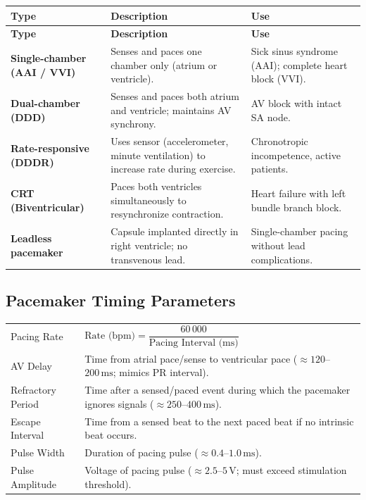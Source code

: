 \documentclass[12pt,a4paper]{article}
\renewcommand{\arraystretch}{1.45}
\begin{document}
\par\noindent
\begingroup
\setlength{\LTleft}{0pt}
\setlength{\LTright}{0pt}
\begin{longtable}{|B{2.8cm}|>{\small\raggedright\arraybackslash}m{\dimexpr(\linewidth-2.8cm-6\arrayrulewidth)/2\relax}|>{\small\raggedright\arraybackslash}m{\dimexpr(\linewidth-2.8cm-6\arrayrulewidth)/2\relax}|}
\hline
\textbf{Type} & \textbf{\color{myteal}Description} & \textbf{\color{mygreen}Use} \\
\hline
\endfirsthead
\hline
\textbf{Type} & \textbf{\color{myteal}Description} & \textbf{\color{mygreen}Use} \\
\hline
\endhead
\textbf{Single-chamber (AAI / VVI)} & Senses and paces one chamber only (atrium or ventricle). & Sick sinus syndrome (AAI); complete heart block (VVI). \\
\hline
\textbf{Dual-chamber (DDD)} & Senses and paces both atrium and ventricle; maintains AV synchrony. & AV block with intact SA node. \\
\hline
\textbf{Rate-responsive (DDDR)} & Uses sensor (accelerometer, minute ventilation) to increase rate during exercise. & Chronotropic incompetence, active patients. \\
\hline
\textbf{CRT (Biventricular)} & Paces both ventricles simultaneously to resynchronize contraction. & Heart failure with left bundle branch block. \\
\hline
\textbf{Leadless pacemaker} & Capsule implanted directly in right ventricle; no transvenous lead. & Single-chamber pacing without lead complications. \\
\hline
\end{longtable}
\endgroup

\subsection{Pacemaker Timing Parameters}

\begin{tcolorbox}[formulabox, title={\textbf{Pacemaker Timing Intervals}}]
\renewcommand{\arraystretch}{1.3}
\begin{tabularx}{\linewidth}{B{3.8cm} X}
Pacing Rate & $\text{Rate (bpm)} = \dfrac{60\,000}{\text{Pacing Interval (ms)}}$ \\[8pt]
AV Delay & Time from atrial pace/sense to ventricular pace ($\approx 120$--$200\,\text{ms}$; mimics PR interval). \\[4pt]
Refractory Period & Time after a sensed/paced event during which the pacemaker ignores signals ($\approx 250$--$400\,\text{ms}$). \\[4pt]
Escape Interval & Time from a sensed beat to the next paced beat if no intrinsic beat occurs. \\[4pt]
Pulse Width & Duration of pacing pulse ($\approx 0.4$--$1.0\,\text{ms}$). \\[4pt]
Pulse Amplitude & Voltage of pacing pulse ($\approx 2.5$--$5\,\text{V}$; must exceed stimulation threshold).
\end{tabularx}
\end{tcolorbox}
\end{document}

